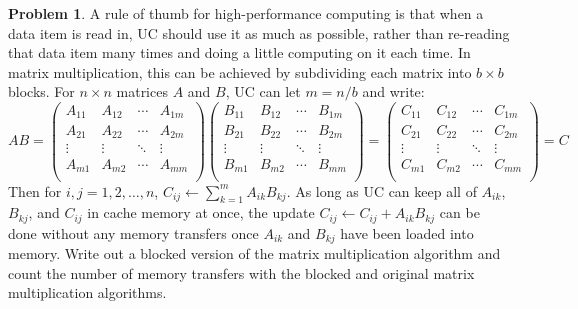\documentclass{article}
\theoremstyle{definition}
\newtheorem{problem}{Problem}[subsection]
\begin{document}
	\newpage
	\setcounter{problem}{2}
	\begin{problem}
		A rule of thumb for high-performance computing is that when a data item is read
		in, UC should use it as much as possible, rather than re-reading that data item
		many times and doing a little computing on it each time. In matrix multiplication, this can be achieved by subdividing each matrix into \(b\times b\) blocks. For \(n\times n\) matrices \(A\) and \(B\), UC can let \(m = n/b\) and write:
		\[
		AB = \begin{pmatrix}
			A_{11} & A_{12} & \cdots & A_{1m}\\
			A_{21} & A_{22} & \cdots & A_{2m}\\
			\vdots & \vdots & \ddots & \vdots\\
			A_{m1} & A_{m2} & \cdots & A_{mm}\\
		\end{pmatrix}
		\begin{pmatrix}
			B_{11} & B_{12} & \cdots & B_{1m}\\
			B_{21} & B_{22} & \cdots & B_{2m}\\
			\vdots & \vdots & \ddots & \vdots\\
			B_{m1} & B_{m2} & \cdots & B_{mm}\\
		\end{pmatrix}
		=     
		\begin{pmatrix}
			C_{11} & C_{12} & \cdots & C_{1m}\\
			C_{21} & C_{22} & \cdots & C_{2m}\\
			\vdots & \vdots & \ddots & \vdots\\
			C_{m1} & C_{m2} & \cdots & C_{mm}\\
		\end{pmatrix}
		= C
		\]
		Then for \(i,j=1,2,\ldots,n\), \(C_{ij}\gets \sum_{k=1}^m A_{ik}B_{kj}\). As long as UC can keep all of \(A_{ik}\), \(B_{kj}\), and \(C_{ij}\) in cache memory at once, the update \(C_{ij} \gets C_{ij} + A_{ik}B_{kj}\) can be done without any memory transfers once \(A_{ik}\) and \(B_{kj}\) have been loaded
		into memory. Write out a blocked version of the matrix multiplication algorithm
		and count the number of memory transfers with the blocked and original matrix
		multiplication algorithms.
	\end{problem}
	
\end{document}
